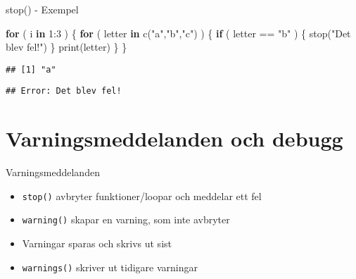 \documentclass[
  11pt,
  ignorenonframetext,
]{beamer}
\newenvironment{Shaded}{\begin{snugshade}}{\end{snugshade}}
\newcommand{\ControlFlowTok}[1]{\textcolor[rgb]{0.13,0.29,0.53}{\textbf{#1}}}
\newcommand{\DecValTok}[1]{\textcolor[rgb]{0.00,0.00,0.81}{#1}}
\newcommand{\FunctionTok}[1]{\textcolor[rgb]{0.00,0.00,0.00}{#1}}
\newcommand{\NormalTok}[1]{#1}
\newcommand{\SpecialCharTok}[1]{\textcolor[rgb]{0.00,0.00,0.00}{#1}}
\newcommand{\StringTok}[1]{\textcolor[rgb]{0.31,0.60,0.02}{#1}}
\providecommand{\tightlist}{%
  \setlength{\itemsep}{0pt}\setlength{\parskip}{0pt}}
\begin{document}
\begin{frame}[fragile]{stop() - Exempel}
\protect\hypertarget{stop---exempel}{}
\begin{Shaded}
\begin{Highlighting}[]
\ControlFlowTok{for}\NormalTok{ ( i }\ControlFlowTok{in} \DecValTok{1}\SpecialCharTok{:}\DecValTok{3}\NormalTok{ ) \{}
  \ControlFlowTok{for}\NormalTok{ ( letter }\ControlFlowTok{in} \FunctionTok{c}\NormalTok{(}\StringTok{"a"}\NormalTok{,}\StringTok{"b"}\NormalTok{,}\StringTok{"c"}\NormalTok{) ) \{}
    \ControlFlowTok{if}\NormalTok{ ( letter }\SpecialCharTok{==} \StringTok{"b"}\NormalTok{ ) \{ }\FunctionTok{stop}\NormalTok{(}\StringTok{"Det blev fel!"}\NormalTok{) \}}
    \FunctionTok{print}\NormalTok{(letter)}
\NormalTok{  \}}
\NormalTok{\}}
\end{Highlighting}
\end{Shaded}

\pause

\begin{verbatim}
## [1] "a"
\end{verbatim}

\begin{verbatim}
## Error: Det blev fel!
\end{verbatim}
\end{frame}

\hypertarget{varningsmeddelanden-och-debugg}{%
\section{Varningsmeddelanden och
debugg}\label{varningsmeddelanden-och-debugg}}

\begin{frame}{Varningsmeddelanden}
\protect\hypertarget{varningsmeddelanden}{}
\begin{itemize}
\tightlist
\item
  \texttt{stop()} avbryter funktioner/loopar och meddelar ett fel
\item
  \texttt{warning()} skapar en varning, som inte avbryter
\item
  Varningar sparas och skrivs ut sist
\item
  \texttt{warnings()} skriver ut tidigare varningar
\end{itemize}
\end{frame}
\end{document}
